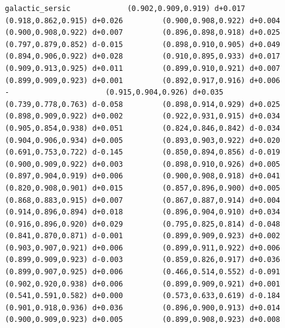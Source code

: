 \documentclass[11pt, letterpaper, openany]{book}
\begin{document}
\begin{empiricalbox}
\begin{lstlisting}[style=terminal]
galactic_sersic             (0.902,0.909,0.919) d+0.017         (0.918,0.862,0.915) d+0.026         (0.900,0.908,0.922) d+0.004         (0.900,0.908,0.922) d+0.007         (0.896,0.898,0.918) d+0.025         (0.797,0.879,0.852) d-0.015         (0.898,0.910,0.905) d+0.049         (0.894,0.906,0.922) d+0.028         (0.910,0.895,0.933) d+0.017         (0.909,0.913,0.925) d+0.011         (0.899,0.910,0.921) d+0.007         (0.899,0.909,0.923) d+0.001         (0.892,0.917,0.916) d+0.006                      -                      (0.915,0.904,0.926) d+0.035         (0.739,0.778,0.763) d-0.058         (0.898,0.914,0.929) d+0.025         (0.898,0.909,0.922) d+0.002         (0.922,0.931,0.915) d+0.034         (0.905,0.854,0.938) d+0.051         (0.824,0.846,0.842) d-0.034         (0.904,0.906,0.934) d+0.005         (0.893,0.903,0.922) d+0.020         (0.691,0.753,0.722) d-0.145         (0.850,0.894,0.856) d-0.019         (0.900,0.909,0.922) d+0.003         (0.898,0.910,0.926) d+0.005         (0.897,0.904,0.919) d+0.006         (0.900,0.908,0.918) d+0.041         (0.820,0.908,0.901) d+0.015         (0.857,0.896,0.900) d+0.005         (0.868,0.883,0.915) d+0.007         (0.867,0.887,0.914) d+0.004         (0.914,0.896,0.894) d+0.018         (0.896,0.904,0.910) d+0.034         (0.916,0.896,0.920) d+0.029         (0.795,0.825,0.814) d-0.048         (0.841,0.870,0.871) d-0.001         (0.899,0.909,0.923) d+0.002         (0.903,0.907,0.921) d+0.006         (0.899,0.911,0.922) d+0.006         (0.899,0.909,0.923) d-0.003         (0.859,0.826,0.917) d+0.036         (0.899,0.907,0.925) d+0.006         (0.466,0.514,0.552) d-0.091         (0.902,0.920,0.938) d+0.006         (0.899,0.909,0.921) d+0.001         (0.541,0.591,0.582) d+0.000         (0.573,0.633,0.619) d-0.184         (0.901,0.918,0.936) d+0.036         (0.896,0.900,0.913) d+0.014         (0.900,0.909,0.923) d+0.005         (0.899,0.908,0.923) d+0.008     

\end{lstlisting}
\end{empiricalbox}
\end{document}
